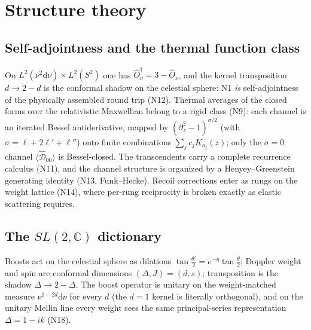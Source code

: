 \documentclass[useAMS,usenatbib]{article}
\newcommand{\Oh}{\hat{O}_\nu}
\newcommand{\Do}{\hat{\mathcal{D}}}
\newcommand{\dd}{\mathrm{d}}
\begin{document}
\section{Structure theory}\label{sec:structure}

\subsection{Self-adjointness and the thermal function class}
On $L^2(\nu^2\dd\nu)\times L^2(S^2)$ one has $\Oh^\dagger = 3-\Oh$, and the kernel transposition
$d\to2-d$ is the conformal shadow on the celestial sphere: N1 \emph{is} self-adjointness of the physically
assembled round trip (N12). Thermal averages of the closed forms over the relativistic Maxwellian belong to a
rigid class (N9): each channel is an iterated Bessel antiderivative, mapped by $(\partial_z^2-1)^{\sigma/2}$
(with $\sigma = \ell+2\ell'+\ell''$) onto finite combinations $\sum_j c_jK_{a_j}(z)$; only the $\sigma=0$
channel $\langle\Do_{00}\rangle$ is Bessel-closed. The transcendents carry a complete recurrence calculus
(N11), and the channel structure is organized by a Henyey--Greenstein generating identity (N13,
Funk--Hecke). Recoil corrections enter as rungs on the weight lattice (N14), where per-rung reciprocity is
broken exactly as elastic scattering requires.

\subsection{The $SL(2,\mathbb C)$ dictionary}
Boosts act on the celestial sphere as dilations $\tan\tfrac{\theta'}2 = e^{-\eta}\tan\tfrac\theta2$; Doppler
weight and spin are conformal dimensions $(\Delta,J) = (d,s)$; transposition is the shadow $\Delta\to2-\Delta$.
The boost operator is unitary on the weight-matched measure $\nu^{1-2d}\dd\nu$ for every $d$ (the $d=1$ kernel
is literally orthogonal), and on the unitary Mellin line every weight sees the same principal-series
representation $\Delta = 1-ik$ (N18).
\end{document}
